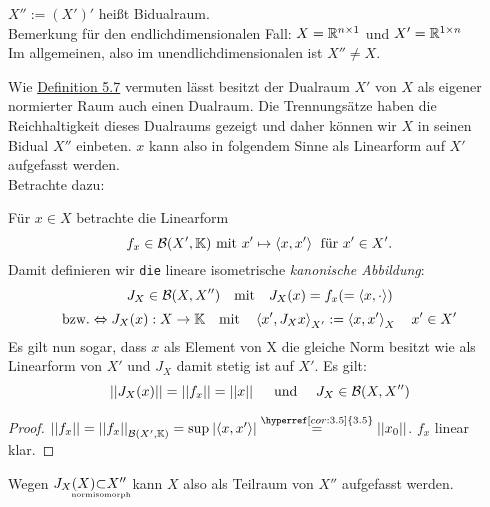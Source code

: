
		\begin{definition}[Bidualraum]
		\label{def:3.7}
			$X'' := (X')' $ heißt Bidualraum. \\
			Bemerkung für den endlichdimensionalen Fall: $X = \mathbb{R}^{n\times 1}$ und $X' = \mathbb{R}^{1 \times n}$ \\
			Im allgemeinen, also im unendlichdimensionalen ist $X'' \neq X$.
		\end{definition}

		\begin{motivation}
		  Wie \hyperref[def:5.7]{Definition 5.7} vermuten lässt besitzt der Dualraum 
			$X'$ von $X$ als eigener normierter Raum auch einen Dualraum. 
			Die Trennungsätze haben die Reichhaltigkeit dieses Dualraums gezeigt und
			daher können wir $X$ in seinen Bidual $X''$ einbeten. 
			$x$ kann also in folgendem Sinne als Linearform auf $X'$ aufgefasst werden.\\
			Betrachte dazu:
		\end{motivation}

		\begin{bem}[Einbettungsisomorphismus $J_X$]
			\def\varI{Test}
			\def\varII{Test}
		Für $x \in X$ betrachte die Linearform 
			$$f_{x}\in \mathcal{B}(X',\mathbb{K}) \text{ mit } x' \mapsto \langle x, x' \rangle 
				\; \text{ für }x' \in X'.$$ 
		Damit definieren wir {\tt die} lineare 
			isometrische {\it kanonische Abbildung}:
		$${J}_{X}\in \mathcal{B}(X,X'')\quad \text{mit} \quad 
			J_X(x) = f_x (= \langle x, \cdot \rangle)$$
			$$\text{bzw.} \overset{}{\Leftrightarrow} J_X(x) : X \to \mathbb{K} \quad \text{mit} \quad 
				\left \langle x', J_X x \right \rangle_{X'} := \left \langle x,x' \right \rangle_X \quad x'\in X'$$ 
		Es gilt nun sogar, dass $x$ als Element von X die gleiche Norm besitzt 
		wie als Linearform von $X'$ und $J_X$ damit stetig ist auf $X'$. Es gilt:
		$$\left\lvert \left\lvert J_X(x) \right\rvert \right\rvert = \left\lvert \left\lvert f_x \right\rvert \right\rvert = \left\lvert \left\lvert x \right\rvert \right\rvert \quad \text{ und }
			\quad J_X \in \mathcal{B}(X,X'')$$	
	
			\begin{proof}
			$\norm{f_{x}} = \norm{f_{x}}_{\B(X',\K)} 
				= \sup_{}|\langle  x, x' \rangle| 
				\overset{\hyperref[cor:3.5]{3.5}}{=} \norm{x_0}$. 
				$f_{x}$ linear klar.
			\end{proof}
		Wegen $J_X(X) \hspace{-2em}
		\underset{\text{\tiny normisomorph}}{\subset} \hspace{-2em} X''$ 
		kann $X$ also als Teilraum von $X''$ aufgefasst werden.
		
		\end{bem}

